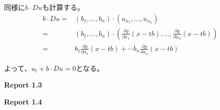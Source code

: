 \documentclass[12pt,b5paper]{ltjsarticle}
\begin{document}
同様に$b\cdot Du$も計算する。
\begin{align}
 b\cdot Du
 =& (b_{1},\dots,b_{n})\cdot(u_{x_{1}},\dots,u_{x_{n}})\\
 =& (b_{1},\dots,b_{n})\cdot\left(\frac{\partial g}{\partial x_{1}}(x-tb),\dots,\frac{\partial g}{\partial x_{n}}(x-tb) \right)\\
 =& b_{1}\frac{\partial g}{\partial x_{1}}(x-tb)+\cdots b_{n}\frac{\partial g}{\partial x_{n}}(x-tb)
\end{align}

よって、$u_{t}+b\cdot Du =0$となる。

\hrulefill

\textbf{Report 1.3}


\dotfill

\hrulefill

\textbf{Report 1.4}


\dotfill

\hrulefill
\end{document}
